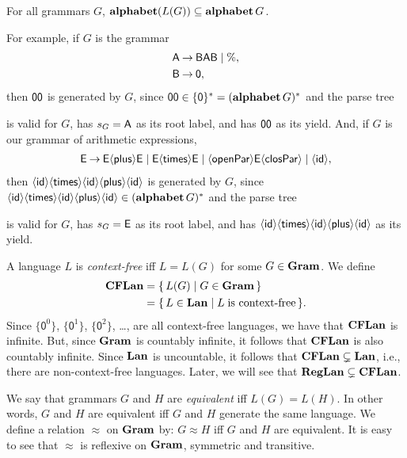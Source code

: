 \begin{proposition}
For all grammars $G$, $\mathbf{alphabet}(L(G))\subseteq\mathbf{alphabet}\,G$.
\end{proposition}

For example, if $G$ is the grammar
\begin{align*}
\mathsf{A} &\mathbin{\to} \mathsf{B}\mathsf{A}\mathsf{B} \mid \% , \\
\mathsf{B} &\mathbin{\to} \mathsf{0} ,
\end{align*}
then $\mathsf{0}\mathsf{0}$ is generated by $G$,
since $\mathsf{0}\mathsf{0}\in\{\mathsf{0}\}^*=(\mathbf{alphabet}\,G)^*$ and
the parse tree
\begin{center}

\end{center}
is valid for $G$, has $s_G=\mathsf{A}$ as its root label,
and has $\mathsf{0}\mathsf{0}$ as its yield.
And, if $G$ is our grammar of arithmetic expressions,
\begin{gather*}
\mathsf{E\mathbin{\to} E{\langle\mathsf{plus}\rangle} E\mid E{\langle\mathsf{times}\rangle} E\mid {\langle\mathsf{openPar}\rangle} E{\langle\mathsf{closPar}\rangle} \mid
{\langle\mathsf{id}\rangle}} ,
\end{gather*}
then ${\langle\mathsf{id}\rangle}{\langle\mathsf{times}\rangle}{\langle\mathsf{id}\rangle}{\langle\mathsf{plus}\rangle}{\langle\mathsf{id}\rangle}$ is generated by $G$,
since ${\langle\mathsf{id}\rangle}{\langle\mathsf{times}\rangle}{\langle\mathsf{id}\rangle}{\langle\mathsf{plus}\rangle}{\langle\mathsf{id}\rangle}\in(\mathbf{alphabet}\,G)^*$ and
the parse tree
\begin{center}

\end{center}
is valid for $G$, has $s_G=\mathsf{E}$ as its root label,
and has ${\langle\mathsf{id}\rangle}{\langle\mathsf{times}\rangle}{\langle\mathsf{id}\rangle}{\langle\mathsf{plus}\rangle}{\langle\mathsf{id}\rangle}$ as its yield.

A language $L$ is \emph{context-free} iff $L=L(G)$ for some
$G\in\mathbf{Gram}$.  We define
\begin{align*}
\mathbf{CFLan} &= \{ \, L(G) \mid G\in\mathbf{Gram} \, \} \\
&= \{ \, L\in\mathbf{Lan} \mid L\;\allowbreak\mbox{is context-free}\allowbreak \, \} .
\end{align*}
Since $\{\mathsf{0}^0\}$, $\{\mathsf{0}^1\}$, $\{\mathsf{0}^2\}$,
\ldots, are all context-free languages, we have that $\mathbf{CFLan}$ is
infinite.  But, since $\mathbf{Gram}$ is countably infinite, it follows that
$\mathbf{CFLan}$ is also countably infinite.
Since $\mathbf{Lan}$ is uncountable, it follows that
$\mathbf{CFLan}\subsetneq\mathbf{Lan}$, i.e., there are non-context-free
languages.  Later, we will see that $\mathbf{RegLan}\subsetneq\mathbf{CFLan}$.

We say that grammars $G$ and $H$ are
\emph{equivalent} iff $L(G) = L(H)$.  In other words, $G$
and $H$ are equivalent iff $G$ and $H$ generate the same
language.  We define a relation $\approx$ on $\mathbf{Gram}$ by:
$G\approx H$ iff $G$ and $H$ are equivalent.  It is easy to see
that $\approx$ is reflexive on $\mathbf{Gram}$, symmetric and transitive.

